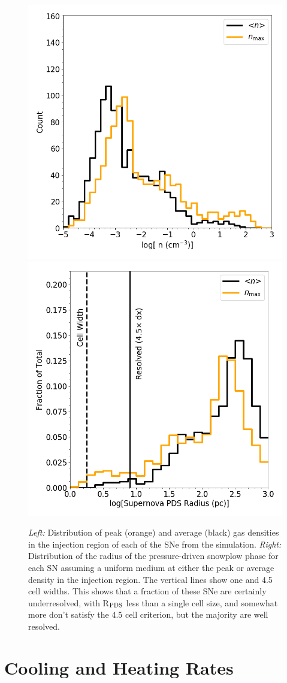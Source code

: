 \documentclass[fleqn,usenatbib,useAMS]{mnras}
\begin{document}
\begin{figure}
\centering
\includegraphics[width=0.4\linewidth]{sn_density_hist}
\includegraphics[width=0.4\linewidth]{sn_radius_hist}
\caption{{\em Left:} Distribution of peak (orange) and average (black) gas densities in the injection region of each of the SNe from the simulation. {\em Right:} Distribution of the radius of the pressure-driven snowplow phase for each SN assuming a uniform medium at either the peak or average density in the injection region. The vertical lines show one and 4.5 cell widths. This shows that a fraction of these SNe are certainly underresolved, with R$_{\rm PDS}$ less than a single cell size, and somewhat more don't satisfy the 4.5 cell criterion, but the majority are well resolved.}
\label{fig:SN histogram}
\end{figure}

\setcounter{figure}{0}
\section{Cooling and Heating Rates}
\label{appendix:cooling}
\end{document}
